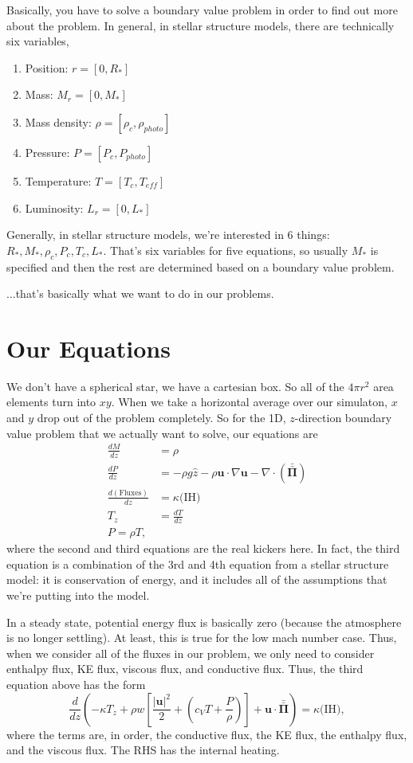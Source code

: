\documentclass[aps, pre, onecolumn, nofootinbib, notitlepage, groupedaddress, amsfonts, amssymb, amsmath, longbibliography]{revtex4-1}
\newcommand{\Div}[1]{\ensuremath{\nabla\cdot\left( #1\right)}}
\newcommand{\grad}{\ensuremath{\nabla}}
\newcommand{\stressT}{\ensuremath{\bm{\bar{\bar{\Pi}}}}}
\begin{document}
Basically, you have to solve a boundary value problem in order to find out more about the
problem.  In general, in stellar structure models, there are technically six variables,
\begin{enumerate}
\item Position: $r = [0, R_*]$
\item Mass: $M_r = [0, M_*]$
\item Mass density: $\rho = [\rho_c, \rho_{photo}]$
\item Pressure: $P = [P_c, P_{photo}]$
\item Temperature: $T = [T_c, T_{eff}]$
\item Luminosity: $L_r = [0, L_*]$
\end{enumerate}
Generally, in stellar structure models, we're interested in 6 things:
$R_*, M_*, \rho_c, P_c, T_c, L_*$.  That's six variables for five equations,
so usually $M_*$ is specified and then the rest are determined based on a boundary value problem.

...that's basically what we want to do in our problems.

\section{Our Equations}
We don't have a spherical star, we have a cartesian box.  So all of the $4\pi r^2$ area
elements turn into $xy$.  When we take a horizontal average over our simulaton, $x$ and $y$
drop out of the problem completely.  So for the 1D, $z$-direction boundary value problem that
we actually want to solve, our equations are
\begin{equation}
\begin{split}
\frac{d M}{dz} &= \rho \\
\frac{d P}{dz} &= -\rho g \hat{z} - \rho \bm{u}\cdot\grad\bm{u} - \Div{\stressT} \\
\frac{d (\text{Fluxes})}{d z} &= \kappa \text{(IH)} \\
T_{z} &= \frac{d T}{d z} \\
P = \rho T,
\end{split}
\end{equation}
where the second and third equations are the real kickers here.  In fact, the third equation is a combination
of the 3rd and 4th equation from a stellar structure model: it is conservation of energy, and it includes
all of the assumptions that we're putting into the model.

In a steady state, potential energy flux is basically zero (because the atmosphere is no longer settling).
At least, this is true for the low mach number case.  Thus, when we consider all of the fluxes in our problem,
we only need to consider enthalpy flux, KE flux, viscous flux, and conductive flux.  Thus, the third equation
above has the form
\begin{equation}
\frac{d}{dz}\left(-\kappa T_z + \rho w \left[\frac{|\bm{u}|^2}{2} + 
\left(c_V T + \frac{P}{\rho}\right)\right] + \bm{u}\cdot\stressT  \right) = \kappa \text{(IH)},
\end{equation}
where the terms are, in order, the conductive flux, the KE flux, the enthalpy flux, and the viscous flux.  The
RHS has the internal heating.
\end{document}
